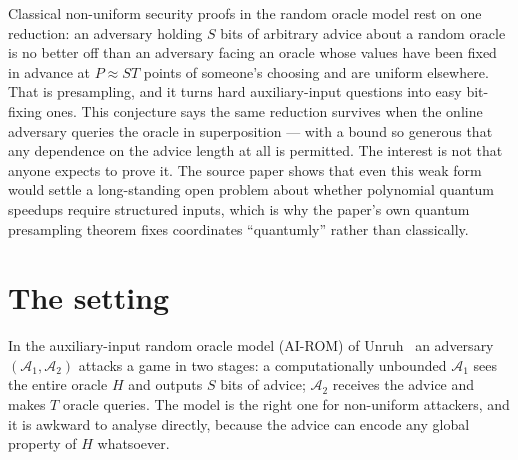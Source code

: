 \documentclass{conjura-conjecture}
\newcommand{\Adv}{\mathcal{A}}
\begin{document}

\vspace{0.4em}

\begin{informalconjecture}
Classical non-uniform security proofs in the random oracle model rest
on one reduction: an adversary holding $S$ bits of arbitrary advice
about a random oracle is no better off than an adversary facing an
oracle whose values have been fixed in advance at $P \approx ST$ points
of someone's choosing and are uniform elsewhere. That is presampling,
and it turns hard auxiliary-input questions into easy bit-fixing ones.
This conjecture says the same reduction survives when the online
adversary queries the oracle in superposition --- with a bound so
generous that any dependence on the advice length at all is permitted.
The interest is not that anyone expects to prove it. The source paper
shows that even this weak form would settle a long-standing open
problem about whether polynomial quantum speedups require structured
inputs, which is why the paper's own quantum presampling theorem fixes
coordinates ``quantumly'' rather than classically.
\end{informalconjecture}

\section{The setting}\label{sec:setting}

In the auxiliary-input random oracle model (AI-ROM) of
Unruh~\cite{Unr07} an adversary $(\Adv_{1}, \Adv_{2})$ attacks a game
in two stages: a computationally unbounded $\Adv_{1}$ sees the entire
oracle $H$ and outputs $S$ bits of advice; $\Adv_{2}$ receives the
advice and makes $T$ oracle queries. The model is the right one for
non-uniform attackers, and it is awkward to analyse directly, because
the advice can encode any global property of $H$ whatsoever.
\end{document}
